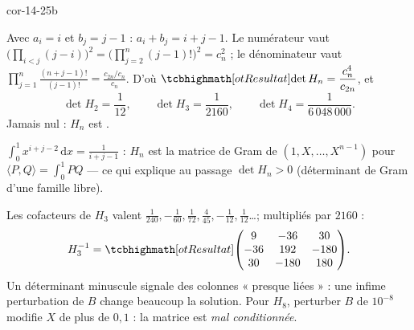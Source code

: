 \begin{blocLivre}{cor-14-25b}
\begin{corrigeSuite}
\begin{questions}[start=5]
  \item Avec $a_i=i$ et $b_j=j-1$ : $a_i+b_j=i+j-1$. Le numérateur vaut
    $\bigl(\prod_{i<j}(j-i)\bigr)^{2}=\bigl(\prod_{j=2}^{n}(j-1)!\bigr)^{2}=c_n^{2}$ ;
    le dénominateur vaut
    $\prod_{j=1}^{n}\frac{(n+j-1)!}{(j-1)!}=\frac{c_{2n}/c_n}{c_n}$. D'où
    $\res{\det H_n=\dfrac{c_n^{4}}{c_{2n}}}$, et
    \[
    \det H_2=\frac{1}{12},\qquad\det H_3=\frac{1}{2160},\qquad
    \det H_4=\frac{1}{6\,048\,000} .
    \]
    Jamais nul : $H_n$ est .
  \item $\displaystyle\int_0^1x^{i+j-2}\,\mathrm{d}x=\frac{1}{i+j-1}$ :
    $H_n$ est la matrice de Gram de $(1,X,\dots,X^{n-1})$ pour
    $\langle P,Q\rangle=\int_0^1PQ$ — ce qui explique au passage
    $\det H_n>0$ (déterminant de Gram d'une famille libre).
  \item Les cofacteurs de $H_3$ valent $\frac1{240},-\frac1{60},\frac1{72},
    \frac4{45},-\frac1{12},\frac1{12}$\dots ; multipliés par $2160$ :
    \[
    H_3^{-1}=\res{\begin{pmatrix}9&-36&30\\-36&192&-180\\30&-180&180\end{pmatrix}} .
    \]
    Un déterminant minuscule signale des colonnes « presque liées » : une
    infime perturbation de $B$ change beaucoup la solution. Pour $H_8$,
    perturber $B$ de $10^{-8}$ modifie $X$ de plus de $0{,}1$ : la matrice
    est \emph{mal conditionnée}.
\end{questions}
\begin{center}
\\[0.5mm]
\end{center}
\end{corrigeSuite}
\end{blocLivre}
